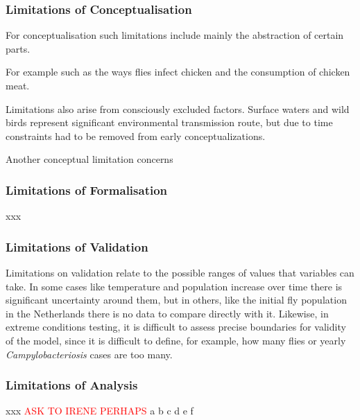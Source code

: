 \subsubsection{Limitations of Conceptualisation}

For conceptualisation such limitations include mainly the abstraction of certain parts. 

For example such as the ways flies infect chicken and the consumption of chicken meat. 

Limitations also arise from consciously excluded factors. Surface waters and wild birds represent significant environmental transmission route, but due to time constraints had to be removed from early conceptualizations. 

Another conceptual limitation concerns

\subsubsection{Limitations of Formalisation}
xxx

\subsubsection{Limitations of Validation}

Limitations on validation relate to the possible ranges of values that variables can take. In some cases like temperature and population increase over time there is significant uncertainty around them, but in others, like the initial fly population in the Netherlands there is no data to compare directly with it. Likewise, in extreme conditions testing, it is difficult to assess precise boundaries for validity of the model, since it is difficult to define, for example, how many flies or yearly \textit{Campylobacteriosis} cases are too many.

\subsubsection{Limitations of Analysis}
xxx
\textcolor{red}{ASK TO IRENE PERHAPS}
a b c d e f

